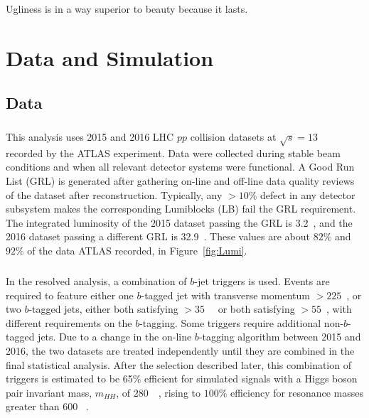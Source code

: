 \begin{savequote}[75mm]
Ugliness is in a way superior to beauty because it lasts.
\end{savequote}
\chapter{Data and Simulation}
%

\section{Data}

\paragraph{}
This analysis uses 2015 and 2016 LHC $pp$ collision datasets at $\sqrt{s} = 13$~\TeV~ recorded by the ATLAS experiment. Data were collected during stable beam conditions and when all relevant detector systems were functional. A Good Run List (GRL) is generated after gathering on-line and off-line data quality reviews of the dataset after reconstruction. Typically, any $> 10\%$ defect in any detector subsystem makes the corresponding Lumiblocks (LB) fail the GRL requirement. The integrated luminosity of the 2015 dataset passing the GRL is 3.2~\ifb, and the 2016 dataset passing a different GRL is 32.9~\ifb. These values are about $82\%$ and $92\%$ of the data ATLAS recorded, in Figure~\ref{fig:Lumi}.

\paragraph{}
In the resolved analysis, a combination of $b$-jet triggers is used. Events are required to feature either one $b$-tagged jet with transverse momentum \pt$>225$~\GeV, or two $b$-tagged jets, either both satisfying \pt$>35$~\GeV~ or both satisfying \pt$>55$~\GeV, with different requirements on the $b$-tagging. Some triggers require additional non-$b$-tagged jets. Due to a change in the on-line $b$-tagging algorithm between 2015 and 2016, the two datasets are treated independently until they are combined in the final statistical analysis. After the selection described later, this combination of triggers is estimated to be 65\% efficient for simulated signals with a Higgs boson pair invariant mass, $m_{HH}$, of $280$~\GeV~, rising to $100\%$ efficiency for resonance masses greater than $600$ \GeV~. 


